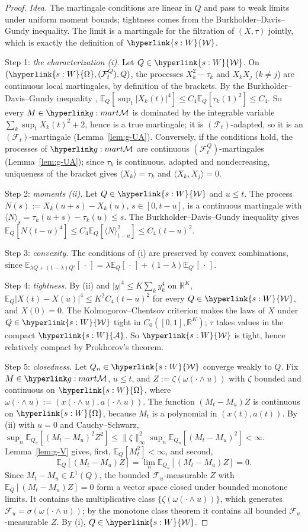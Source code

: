 \documentclass[11pt]{article}
\DeclareRobustCommand{\sy}[2]{{\hyperlink{#1}{#2}}}
\newcommand{\R}{\mathbb{R}}
\newcommand{\E}{\mathbb{E}}
\newcommand{\1}{\mathbf{1}}
\newcommand{\Wc}{\sy{s:W}{\mathcal W}}
\newcommand{\Om}{\sy{s:W}{\Omega}}
\newcommand{\Al}{\sy{s:W}{\mathcal A}}
\begin{document}
\begin{proof}
\textit{Idea.} The martingale conditions are linear in $Q$ and pass to weak limits under uniform moment bounds; tightness comes from the
Burkholder--Davis--Gundy inequality. The limit is a martingale for the filtration of $(X,\tau)$ jointly, which is exactly the definition of $\Wc$.

Step 1: \emph{the characterization (i).} Let $Q\in\Wc$. On $(\Om,(\mathcal F^Q_t),Q)$, the processes $X_k^2-\tau_k$ and $X_kX_j$ ($k\ne j$) are continuous local
martingales, by definition of the brackets. By the Burkholder--Davis--Gundy inequality \citep[Thm~3.3.28]{KS91}, $\E_Q[\sup_t|X_k(t)|^4]\le C_4\E_Q[\tau_k(1)^2]\le C_4$.
So every $M\in\gMc$ is dominated by the integrable variable $\sum_k\sup_tX_k(t)^2+2$, hence is a true martingale; it is $(\mathcal F_t)$-adapted, so it is an
$(\mathcal F_t)$-martingale (Lemma~\ref{lem:g-UA}). Conversely, if the conditions hold, the processes of $\gMc$ are continuous $(\mathcal F^Q_t)$-martingales (Lemma~\ref{lem:g-UA}); since
$\tau_k$ is continuous, adapted and nondecreasing, uniqueness of the bracket gives $\langle X_k\rangle=\tau_k$ and $\langle X_k,X_j\rangle=0$.

Step 2: \emph{moments (ii).} Let $Q\in\Wc$ and $u\le t$. The process $N(s):=X_k(u+s)-X_k(u)$, $s\in[0,t-u]$, is a continuous martingale with
$\langle N\rangle_s=\tau_k(u+s)-\tau_k(u)\le s$. The Burkholder--Davis--Gundy inequality gives $\E_Q[N(t-u)^4]\le C_4\E_Q[\langle N\rangle_{t-u}^2]\le C_4(t-u)^2$.

Step 3: \emph{convexity.} The conditions of (i) are preserved by convex combinations, since $\E_{\lambda Q+(1-\lambda)Q'}[\,\cdot\,]=\lambda\E_Q[\,\cdot\,]+(1-\lambda)\E_{Q'}[\,\cdot\,]$.

Step 4: \emph{tightness.} By (ii) and $|y|^4\le K\sum_ky_k^4$ on $\R^K$, $\E_Q|X(t)-X(u)|^4\le K^2C_4(t-u)^2$ for every $Q\in\Wc$, and $X(0)=0$. The Kolmogorov--Chentsov
criterion \citep[Problem~2.4.11]{KS91} makes the laws of $X$ under $Q\in\Wc$ tight in $C_0([0,1],\R^K)$; $\tau$ takes values in the compact $\Al$. So $\Wc$ is tight, hence
relatively compact by Prokhorov's theorem.

Step 5: \emph{closedness.} Let $Q_n\in\Wc$ converge weakly to $Q$. Fix $M\in\gMc$, $u\le t$, and $Z:=\zeta(\omega(\cdot\wedge u))$ with $\zeta$ bounded and continuous on
$\Om$, where $\omega(\cdot\wedge u):=(x(\cdot\wedge u),a(\cdot\wedge u))$. The function $(M_t-M_u)Z$ is continuous on $\Om$, because $M_t$ is a polynomial in $(x(t),a(t))$.
By (ii) with $u=0$ and Cauchy--Schwarz, $\sup_n\E_{Q_n}[(M_t-M_u)^2Z^2]\le\|\zeta\|_\infty^2\sup_n\E_{Q_n}[(M_t-M_u)^2]<\infty$. Lemma~\ref{lem:g-V} gives, first, $\E_Q[M_t^2]<\infty$,
and second,
\[
\E_Q[(M_t-M_u)Z]=\lim_n\E_{Q_n}[(M_t-M_u)Z]=0 .
\]
Since $M_t-M_u\in L^1(Q)$, the bounded $\mathcal F_u$-measurable $Z$ with $\E_Q[(M_t-M_u)Z]=0$ form a vector space closed under bounded monotone limits. It contains the
multiplicative class $\{\zeta(\omega(\cdot\wedge u))\}$, which generates $\mathcal F_u=\sigma(\omega(\cdot\wedge u))$; by the monotone class theorem it contains all bounded
$\mathcal F_u$-measurable $Z$. By (i), $Q\in\Wc$.
\end{proof}
\end{document}
